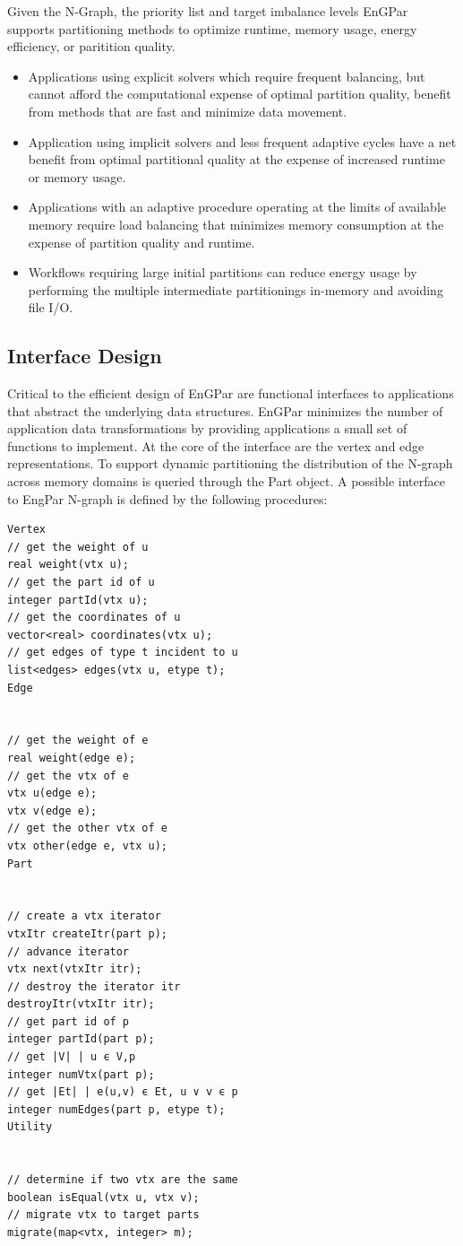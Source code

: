 \documentclass[12pt]{article}
\begin{document}
Given the N-Graph, the priority list and target imbalance levels EnGPar supports
partitioning methods to optimize runtime, memory usage, energy efficiency, or
paritition quality.
\begin{itemize}
  \item Applications using explicit solvers which require frequent balancing,
    but cannot afford the computational expense of optimal partition quality,
    benefit from methods that are fast and minimize data movement.
  \item Application using implicit solvers and less frequent adaptive cycles
    have a net benefit from optimal partitional quality at the expense of
    increased runtime or memory usage.
  \item Applications with an adaptive procedure operating at the limits of
    available memory require load balancing that minimizes memory consumption at
    the expense of partition quality and runtime.
  \item Workflows requiring large initial partitions can reduce energy usage by
    performing the multiple intermediate partitionings in-memory and avoiding
    file I/O.
\end{itemize}


\subsection{Interface Design}

Critical to the efficient design of EnGPar are functional interfaces to
applications that abstract the underlying data structures.
EnGPar minimizes the number of application data transformations by providing
applications a small set of functions to implement.
At the core of the interface are the vertex and edge representations.
To support dynamic partitioning the distribution of the N-graph across memory
domains is queried through the Part object.
A possible interface to EngPar N-graph is defined by the following procedures:

\begin{verbatim}
Vertex
// get the weight of u
real weight(vtx u); 
// get the part id of u
integer partId(vtx u); 
// get the coordinates of u
vector<real> coordinates(vtx u);
// get edges of type t incident to u
list<edges> edges(vtx u, etype t); 
Edge


// get the weight of e
real weight(edge e); 
// get the vtx of e
vtx u(edge e);
vtx v(edge e); 
// get the other vtx of e
vtx other(edge e, vtx u);
Part


// create a vtx iterator 
vtxItr createItr(part p); 
// advance iterator
vtx next(vtxItr itr);
// destroy the iterator itr
destroyItr(vtxItr itr);
// get part id of p
integer partId(part p);
// get |V| | u ϵ V,p 
integer numVtx(part p);
// get |Et| | e(u,v) ϵ Et, u ∨ v ϵ p 
integer numEdges(part p, etype t);
Utility


// determine if two vtx are the same
boolean isEqual(vtx u, vtx v); 
// migrate vtx to target parts
migrate(map<vtx, integer> m);
\end{verbatim}
\end{document}
